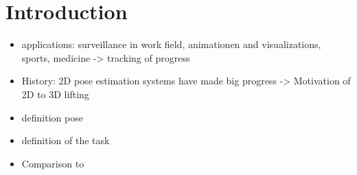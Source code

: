 \section{Introduction}


\begin{itemize}
	\item applications: surveillance in work field, animationen and visualizations, sports, medicine -> tracking of progress
	\item History: 2D pose estimation systems have made big progress -> Motivation of 2D to 3D lifting
	\item definition pose
	\item definition of the task
	\item Comparison to \citet{wandt19}
\end{itemize}